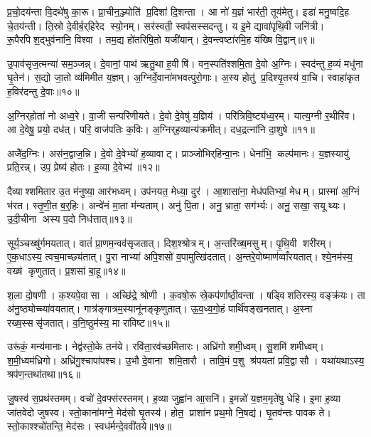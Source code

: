 प्र॒चो॒दय॑न्ता वि॒दथे॑षु का॒रू। प्रा॒चीन॒ञ्ज्योति॑ प्र॒दिशा॑ दि॒शन्ता। आ नो॑ य॒ज्ञं भार॑ती॒ तूय॑मेतु। इडा॑ मनु॒ष्वदि॒ह चे॒तय॑न्ती। ति॒स्रो दे॒वीर्ब॒र्‌हिरेद स्यो॒नम्। सर॑स्वती॒ स्वप॑सस्सदन्तु। य इ॒मे द्यावा॑पृथि॒वी जनि॑त्री। रू॒पैरपिश॒द्भुव॑नानि॒ विश्वा। तम॒द्य हो॑तरिषि॒तो यजी॑यान्। दे॒वन्त्वष्टा॑रमि॒ह य॑ख्षि वि॒द्वान्॥९॥

उ॒पाव॑सृज॒त्मन्या॑ सम॒ञ्जन्न्। दे॒वानां॒ पाथ॑ ऋतु॒था ह॒वीषि॑। वन॒स्पति॑श्शमि॒ता दे॒वो अ॒ग्निः। स्वद॑न्तु ह॒व्यं मधु॑ना घृ॒तेन॑। स॒द्यो जा॒तो व्य॑मिमीत य॒ज्ञम्। अ॒ग्निर्दे॒वाना॑मभवत्पुरो॒गाः। अ॒स्य होतु॑ प्र॒दिश्यृ॒तस्य॑ वा॒चि। स्वाहा॑कृत ह॒विर॑दन्तु दे॒वाः॥१०॥\anuvakamend[य॒ज्ञैस्स्यो॒नं यज॑ध्यै वि॒द्वान॒ष्टौ च॑]

अ॒ग्निर्‌होता॑ नो अध्व॒रे। वा॒जी सन्परि॑णीयते। दे॒वो दे॒वेषु॑ य॒ज्ञिय॑। परि॑त्रिवि॒ष्ट्य॑ध्व॒रम्। यात्य॒ग्नी र॒थीरि॑व। आ दे॒वेषु॒ प्रयो॒ दध॑त्। परि॒ वाज॑पतिः क॒विः। अ॒ग्निर्‌ह॒व्यान्य॑क्रमीत्। दध॒द्रत्ना॑नि दा॒शुषे॥११॥\anuvakamend[अ॒ग्निर्‌होता॑ नो॒ नव॑]

अजै॑द॒ग्निः। अस॑न॒द्वाज॒न्नि। दे॒वो दे॒वेभ्यो॑ ह॒व्यावाट्। प्राञ्जो॑भिर्‌हिन्वा॒नः। धेना॑भि॒ कल्प॑मानः। य॒ज्ञस्यायु॑ प्रति॒रन्न्। उप॒ प्रेष्य॑ होतः। ह॒व्या दे॒वेभ्य॑॥१२॥\anuvakamend[अजै॑द॒ष्टौ]

दैव्याश्शमितार उ॒त म॑नुष्या॒ आर॑भध्वम्। उप॑नयत॒ मेध्या॒ दुर॑। आ॒शासा॑ना॒ मेध॑पतिभ्यां॒ मेधम्। प्रास्मा॑ अ॒ग्निं भ॑रत। स्तृ॒णी॒त ब॒र्॒हिः। अन्वे॑नं मा॒ता म॑न्यताम्। अनु॑ पि॒ता। अनु॒ भ्राता॒ सग॑र्भ्यः। अनु॒ सखा॒ सयूथ्यः। उ॒दी॒चीना अस्य प॒दो निध॑त्तात्॥१३॥

सूर्य॒ञ्चख्षु॑र्गमयतात्। वातं॑ प्रा॒णम॒न्वव॑सृजतात्। दिश॒श्श्रोत्रम्। अ॒न्तरि॑ख्ष॒मसुम्। पृ॒थि॒वी शरी॑रम्। ए॒क॒धाऽस्य॒ त्वच॒माच्छ्य॑तात्। पु॒रा नाभ्या॑ अपि॒शसो॑ व॒पामुत्खि॑दतात्। अ॒न्तरे॒वोष्माण॑व्वाँरयतात्। श्ये॒नम॑स्य॒ वख्ष॑ कृणुतात्। प्र॒शसा॑ बा॒हू॥१४॥

श॒ला दो॒षणी। क॒श्यपे॒वासा। अच्छि॑द्रे॒ श्रोणी। क॒वषो॒रू स्रे॒कप॑र्णाष्ठी॒वन्ता। षड्विशतिरस्य॒ वङ्क्र॑यः। ता अ॑नु॒ष्ठ्योच्च्या॑वयतात्। गात्र॑ङ्गात्रम॒स्यानू॑नङ्कृणुतात्। ऊ॒व॒ध्य॒गो॒हं पार्थि॑वङ्खनतात्। अ॒स्ना रख्ष॒स्ससृ॑जतात्। व॒नि॒ष्ठुम॑स्य॒ मा रा॑विष्ट॥१५॥

उरू॑कं॒ मन्य॑मानाः। नेद्व॑स्तो॒के तन॑ये। रवि॑ता॒रव॑च्छमितारः। अध्रि॑गो शमी॒ध्वम्। सु॒शमि॑ शमीध्वम्। श॒मी॒ध्वम॑ध्रिगो। अध्रि॑गु॒श्चापा॑पश्च। उ॒भौ दे॒वाना शमि॒तारौ। तावि॒मं प॒शु श्र॑पयतां प्रवि॒द्वासौ। यथा॑यथाऽस्य॒ श्रप॑ण॒न्तथा॑तथा॥१६॥\anuvakamend[ध॒त्ता॒द्बा॒हू मा रा॑विष्ट॒ तथा॑तथा]

जु॒षस्व॑ स॒प्रथ॑स्तमम्। वचो॑ दे॒वफ्स॑रस्तमम्। ह॒व्या जुह्वा॑न आ॒सनि॑। इ॒मन्नो॑ य॒ज्ञम॒मृते॑षु धेहि। इ॒मा ह॒व्या जा॑तवेदो जुषस्व। स्तो॒काना॑मग्ने॒ मेद॑सो घृ॒तस्य॑। होत॒ प्राशा॑न प्रथ॒मो नि॒षद्य॑। घृ॒तव॑न्तः पावक ते। स्तो॒काश्श्चो॑तन्ति॒ मेद॑सः। स्वध॑र्मन्दे॒ववी॑तये॥१७॥

